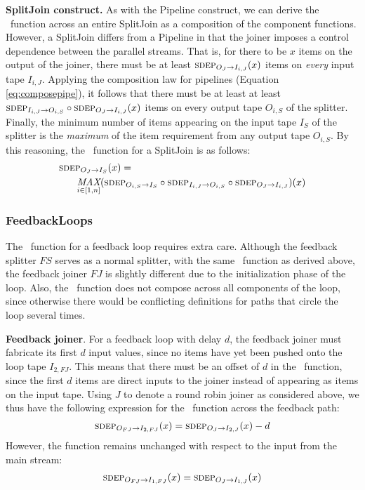 {\bf SplitJoin construct.}  As with the Pipeline construct, we can
derive the \sdep~function across an entire SplitJoin as a composition
of the component functions.  However, a SplitJoin differs from a
Pipeline in that the joiner imposes a control dependence between the
parallel streams.  That is, for there to be $x$ items on the output of
the joiner, there must be at least $\mi{I_{i,J}}{O_J}(x)$ items on {\it
every} input tape $I_{i,J}$.  Applying the composition law for pipelines
(Equation \ref{eq:composepipe}), it follows that there must be at
least at least $\mi{O_{i,S}}{I_{i,J}} \circ \mi{I_{i,J}}{O_J}(x)$ items on
every output tape $O_{i,S}$ of the splitter.  Finally, the minimum number
of items appearing on the input tape $I_S$ of the splitter is the {\it
maximum} of the item requirement from any output tape $O_{i,S}$.  By this
reasoning, the \sdep~function for a SplitJoin is as follows:
\begin{align*}
&\mi{I_S}{O_J}(x) = \\ &~~~~~\fn{MAX}_{i \in [1,n]}(\mi{I_S}{O_{i,S}} \circ
\mi{O_{i,S}}{I_{i,J}} \circ \mi{I_{i,J}}{O_J})(x)
\end{align*}

\subsubsection{FeedbackLoops}
\label{sec:timefl}

The \sdep~function for a feedback loop requires extra care. Although
the feedback splitter $FS$ serves as a normal splitter, with the same
\sdep~function as derived above, the feedback joiner $FJ$ is slightly
different due to the initialization phase of the loop.  Also, the
\sdep~function does not compose across all components of the loop,
since otherwise there would be conflicting definitions for paths that
circle the loop several times.

{\bf Feedback joiner}.  For a feedback loop with delay $d$, the
feedback joiner must fabricate its first $d$ input values, since no
items have yet been pushed onto the loop tape $I_{2,FJ}$.  This means
that there must be an offset of $d$ in the \sdep~function, since the
first $d$ items are direct inputs to the joiner instead of appearing
as items on the input tape.  Using $J$ to denote a round robin joiner
as considered above, we thus have the following expression for the
\sdep~function across the feedback path:
\begin{align*}
\mi{I_{2,FJ}}{O_{FJ}}(x) = \mi{I_{2,J}}{O_J}(x) - d
\end{align*}
However, the \sdep function remains unchanged with respect to the
input from the main stream:
\begin{align*}
\mi{I_{1,FJ}}{O_{FJ}}(x) = \mi{I_{1,J}}{O_J}(x)
\end{align*}

